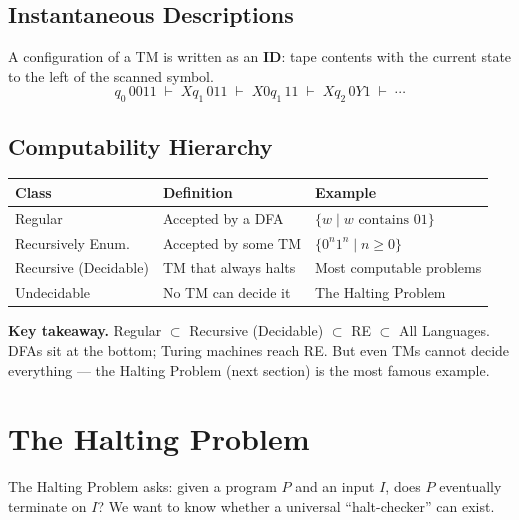 \documentclass[11pt, a4paper]{article}
\theoremstyle{definition}
\theoremstyle{remark}
\begin{document}
\subsection{Instantaneous Descriptions}

A configuration of a TM is written as an \textbf{ID}: tape contents with the current state
to the left of the scanned symbol.
\[
  q_0\,0011\;\vdash\;Xq_1\,011\;\vdash\;X0q_1\,11
  \;\vdash\;Xq_2\,0Y1\;\vdash\;\cdots
\]

\subsection{Computability Hierarchy}

\begin{center}
\begin{tabular}{lll}
  \toprule
  Class & Definition & Example \\
  \midrule
  Regular              & Accepted by a DFA            & $\{w\mid w\text{ contains }01\}$ \\
  Recursively Enum.    & Accepted by some TM           & $\{0^n1^n\mid n\geq 0\}$ \\
  Recursive (Decidable)& TM that always halts          & Most computable problems \\
  Undecidable          & No TM can decide it           & The Halting Problem \\
  \bottomrule
\end{tabular}
\end{center}

\begin{insightbox}
\textbf{Key takeaway.}  Regular $\subset$ Recursive (Decidable) $\subset$ RE $\subset$
All Languages.  DFAs sit at the bottom; Turing machines reach RE\@.  But even TMs
cannot decide everything --- the Halting Problem (next section) is the most famous example.
\end{insightbox}

\section{The Halting Problem}

The Halting Problem asks: given a program $P$ and an input $I$, does $P$ eventually
terminate on $I$?  We want to know whether a universal ``halt-checker'' can exist.
\end{document}
